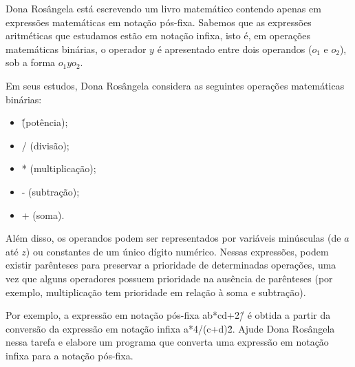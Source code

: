 Dona Rosângela está escrevendo um livro matemático contendo apenas em expressões matemáticas em notação pós-fixa. Sabemos que as expressões aritméticas que estudamos estão em notação infixa, isto é, em operações matemáticas binárias, o operador $y$ é apresentado entre dois operandos ($o_1$ e $o_2$), sob a forma $o_1 y o_2$.

Em seus estudos, Dona Rosângela considera as seguintes operações matemáticas binárias:

\begin{itemize}
\item \^ (potência);
\item / (divisão);
\item * (multiplicação);
\item - (subtração);
\item + (soma).
\end{itemize}

Além disso, os operandos podem ser representados por variáveis minúsculas (de $a$ até $z$) ou constantes de um único dígito numérico. Nessas expressões, podem existir parênteses para preservar a prioridade de determinadas operações, uma vez que alguns operadores possuem prioridade na ausência de parênteses (por exemplo, multiplicação tem prioridade em relação à soma e subtração).

Por exemplo, a expressão em notação pós-fixa ab*cd+2\^/ é obtida a partir da conversão da expressão em notação infixa a*4/(c+d)\^2. Ajude Dona Rosângela nessa tarefa e elabore um programa que converta uma expressão em notação infixa para a notação pós-fixa.
